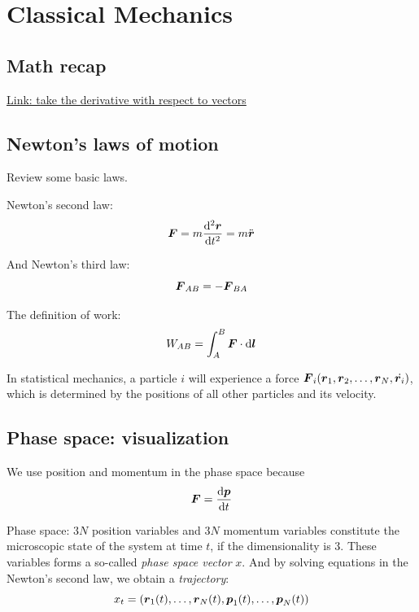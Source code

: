 
\chapter{Classical Mechanics}

\section{Math recap}

\href{https://www.cnblogs.com/yanghh/p/13756471.html}{Link: take the derivative with respect to vectors}

\section{Newton's laws of motion}

Review some basic laws.

Newton's second law:
\begin{equation}
	\boldsymbol{F}=m\dfrac{\mathrm{d}^2 \boldsymbol{r}}{\mathrm{d} t^2}=m\ddot{\boldsymbol{r}} \label{eq:newton2nd}
\end{equation}

And Newton's third law:
\begin{equation}
	\boldsymbol{F}_{AB}=-\boldsymbol{F}_{BA}
\end{equation}

The definition of work:
\begin{equation}
	W_{AB}=\int_A^B\boldsymbol{F}\cdot\mathrm{d}\boldsymbol{l}
\end{equation}

In statistical mechanics, a particle $i$ will experience a force $\boldsymbol{F}_i(\boldsymbol{r}_1, \boldsymbol{r}_2,\dots, \boldsymbol{r}_N, \dot{\boldsymbol{r}_i})$, which is determined by the positions of all other particles and its velocity. 

\section{Phase space: visualization}

We use position and momentum in the phase space because
\begin{equation}
	\boldsymbol{F}=\dfrac{\mathrm{d} \boldsymbol{p}}{\mathrm{d} t} \label{rp}
\end{equation}

Phase space: $3N$ position variables and $3N$ momentum variables constitute the microscopic state of the system at time $t$, if the dimensionality is 3. These variables forms a so-called \textit{phase space vector} $x$. And by solving equations in the Newton's second law, we obtain a \textit{trajectory}:
\begin{equation}
	x_t=\left(\boldsymbol{r}_1(t), \dots, \boldsymbol{r}_N(t), \boldsymbol{p}_1(t), \dots, \boldsymbol{p}_N(t)\right) \label{eq:phase-space-vector}
\end{equation}

